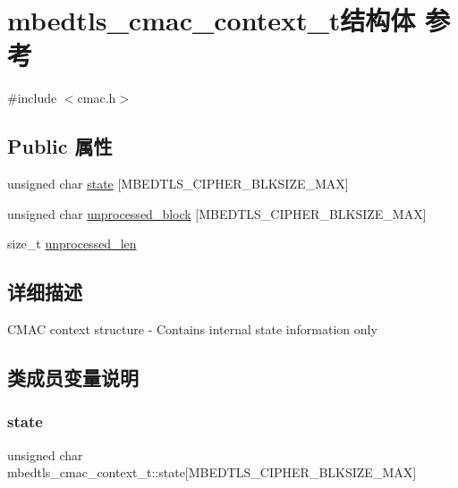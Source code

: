 \hypertarget{structmbedtls__cmac__context__t}{}\section{mbedtls\+\_\+cmac\+\_\+context\+\_\+t结构体 参考}
\label{structmbedtls__cmac__context__t}


{\ttfamily \#include $<$cmac.\+h$>$}

\subsection*{Public 属性}
\begin{DoxyCompactItemize}
\item 
unsigned char \hyperlink{structmbedtls__cmac__context__t_ae87d681008dd82481a5b97559db68010}{state} \mbox{[}M\+B\+E\+D\+T\+L\+S\+\_\+\+C\+I\+P\+H\+E\+R\+\_\+\+B\+L\+K\+S\+I\+Z\+E\+\_\+\+M\+AX\mbox{]}
\item 
unsigned char \hyperlink{structmbedtls__cmac__context__t_a2d58c18be7180b1284a06f2a29291663}{unprocessed\+\_\+block} \mbox{[}M\+B\+E\+D\+T\+L\+S\+\_\+\+C\+I\+P\+H\+E\+R\+\_\+\+B\+L\+K\+S\+I\+Z\+E\+\_\+\+M\+AX\mbox{]}
\item 
size\+\_\+t \hyperlink{structmbedtls__cmac__context__t_a96b77ca1c7dba6980356a37086870fab}{unprocessed\+\_\+len}
\end{DoxyCompactItemize}


\subsection{详细描述}
C\+M\+AC context structure -\/ Contains internal state information only 

\subsection{类成员变量说明}
\mbox{\label{structmbedtls__cmac__context__t_ae87d681008dd82481a5b97559db68010}} 
\subsubsection{\texorpdfstring{state}{state}}
{\footnotesize\ttfamily unsigned char mbedtls\+\_\+cmac\+\_\+context\+\_\+t\+::state\mbox{[}M\+B\+E\+D\+T\+L\+S\+\_\+\+C\+I\+P\+H\+E\+R\+\_\+\+B\+L\+K\+S\+I\+Z\+E\+\_\+\+M\+AX\mbox{]}}

